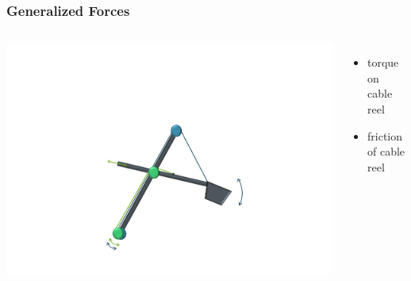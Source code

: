 \begin{frame}
	\frametitle{Generalized Forces}
	\begin{columns}
			\centering
			\includegraphics[trim=30cm 5cm 30cm 23cm, clip=true, width=\linewidth]{img/Excavator_Only}
			\begin{itemize}
				\item{torque on cable reel}
				\item{friction of cable reel}
			\end{itemize}
	\end{columns}
\end{frame}


